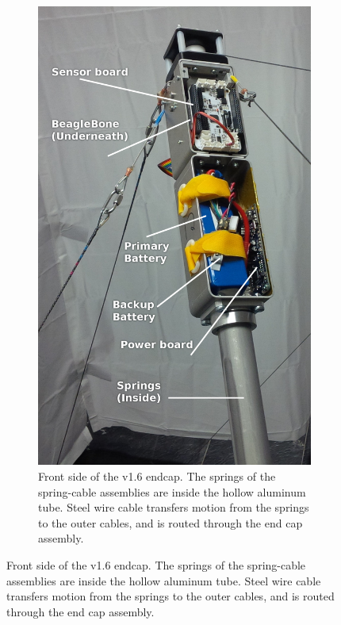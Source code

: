 \documentclass[12pt]{report}
\begin{document}
\begin{figure}
  \centering
  \begin{subfigure}[t]{0.35\textwidth}
    \includegraphics[width=1\textwidth]{img/endcap_upclose_sensorboard_labelled.jpg}
    \caption{Front side of the v1.6 endcap. The springs of the spring-cable assemblies are inside the hollow aluminum tube. Steel wire cable transfers motion from the springs to the outer cables, and is routed through the end cap assembly.}
    \label{fig:final_endcap_front}
  \end{subfigure}
  \hspace{0.5cm}

\end{figure}
\end{document}
